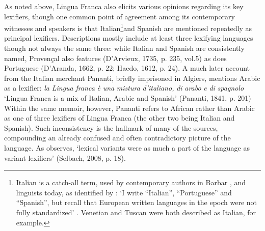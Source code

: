 \documentclass[output=paper]{langsci/langscibook}
\begin{document}
As noted above, Lingua Franca also elicits various opinions regarding its key lexifiers, though one common point of agreement among its contemporary witnesses and speakers is that Italian\footnote{Italian is a catch-all term, used by contemporary authors in Barbar , and linguists today, as identified by \citet{Trivellato2009}: \textrm{‘I write “Italian”, “Portuguese” and “Spanish”, but recall that European written languages in the epoch were not fully standardized’ \citep[178]{Trivellato2009}. Venetian and Tuscan were both described as Italian, for example.}}and Spanish are mentioned repeatedly as principal lexifiers. Descriptions mostly include at least three lexifying languages though not always the same three: while Italian and Spanish are consistently named, Provençal also features (D’Arvieux, 1735, p. 235, vol.5) as does Portuguese (D’Aranda, 1662, p. 22; Haedo, 1612, p. 24).  A much later account from the Italian merchant Pananti, briefly imprisoned in Algiers, mentions Arabic as a lexifier: \textit{la} \textit{Lingua} \textit{franca} \textit{è} \textit{una} \textit{mistura} \textit{d’italiano,} \textit{di} \textit{arabo} \textit{e} \textit{di} \textit{spagnolo} ‘Lingua Franca is a mix of Italian, Arabic and Spanish’ (Pananti, 1841, p. 201) Within the same memoir, however, Pananti refers to African rather than Arabic as one of three lexifiers of Lingua Franca (the other two being Italian and Spanish). Such inconsistency is the hallmark of many of the sources, compounding an already confused and often contradictory picture of the language. As \citet{Selbach2008} observes, ‘lexical variants were as much a part of the language as variant lexifiers’ (Selbach, 2008, p. 18).
\end{document}
